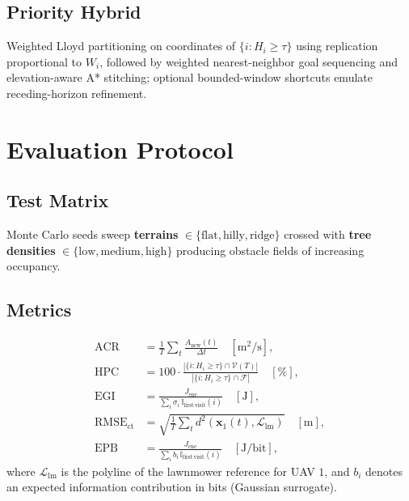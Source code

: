 \documentclass[conference]{IEEEtran}
\begin{document}
\subsection{Priority Hybrid}
Weighted Lloyd partitioning on coordinates of $\{i:H_i\ge\tau\}$ using replication proportional to $W_i$, followed by weighted nearest-neighbor goal sequencing and elevation-aware A* stitching; optional bounded-window shortcuts emulate receding-horizon refinement.

\section{Evaluation Protocol}
\subsection{Test Matrix}
Monte Carlo seeds sweep \textbf{terrains} $\in\{\mathrm{flat},\mathrm{hilly},\mathrm{ridge}\}$ crossed with \textbf{tree densities} $\in\{\mathrm{low},\mathrm{medium},\mathrm{high}\}$ producing obstacle fields of increasing occupancy.

\subsection{Metrics}
\begin{align}
\mathrm{ACR} &= \frac{1}{T}\sum_{t}\frac{A_{\mathrm{new}}(t)}{\Delta t}\quad [\mathrm{m}^2/\mathrm{s}],\\
\mathrm{HPC} &= 100\cdot\frac{\left|\{i:H_i\ge\tau\}\cap\mathcal{V}(T)\right|}{\left|\{i:H_i\ge\tau\}\cap\mathcal{F}\right|}\quad [\%],\\
\mathrm{EGI} &= \frac{J_{\mathrm{ene}}}{\sum_i \sigma_i\,\mathbb{I}_{\mathrm{first\,visit}}(i)}\quad [\mathrm{J}],\\
\mathrm{RMSE}_{\mathrm{ct}} &= \sqrt{\frac{1}{T}\sum_t d^2(\mathbf{x}_1(t),\mathcal{L}_{\mathrm{lm}})}\quad [\mathrm{m}],\\
\mathrm{EPB} &= \frac{J_{\mathrm{ene}}}{\sum_i b_i\,\mathbb{I}_{\mathrm{first\,visit}}(i)}\quad [\mathrm{J/bit}],
\end{align}
where $\mathcal{L}_{\mathrm{lm}}$ is the polyline of the lawnmower reference for UAV $1$, and $b_i$ denotes an expected information contribution in bits (Gaussian surrogate).
\end{document}
